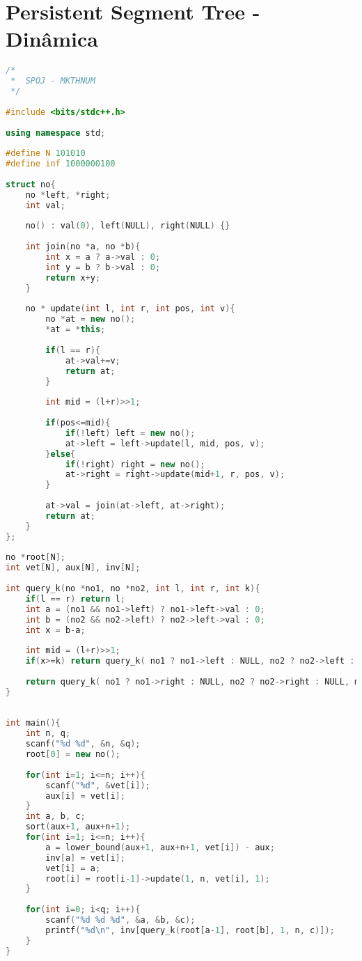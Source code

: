 \documentclass[12pt,a4paper,twoside]{report}
\begin{document}
\section{Persistent Segment Tree - Dinâmica}
\noindent\begin{lstlisting}[caption=Persistent Segment Tree - Dinâmica,language=C++]
/*
 *  SPOJ - MKTHNUM
 */
 
#include <bits/stdc++.h>
 
using namespace std;
 
#define N 101010
#define inf 1000000100
 
struct no{
    no *left, *right;
    int val;
     
    no() : val(0), left(NULL), right(NULL) {}
     
    int join(no *a, no *b){
        int x = a ? a->val : 0;
        int y = b ? b->val : 0;
        return x+y;
    }
     
    no * update(int l, int r, int pos, int v){
        no *at = new no();
        *at = *this;
         
        if(l == r){
            at->val+=v;
            return at;
        }
         
        int mid = (l+r)>>1;
         
        if(pos<=mid){
            if(!left) left = new no();
            at->left = left->update(l, mid, pos, v);
        }else{
            if(!right) right = new no();
            at->right = right->update(mid+1, r, pos, v);
        }
         
        at->val = join(at->left, at->right);
        return at;
    }
};
 
no *root[N];
int vet[N], aux[N], inv[N];
 
int query_k(no *no1, no *no2, int l, int r, int k){
    if(l == r) return l;
    int a = (no1 && no1->left) ? no1->left->val : 0;
    int b = (no2 && no2->left) ? no2->left->val : 0;
    int x = b-a;
     
    int mid = (l+r)>>1;
    if(x>=k) return query_k( no1 ? no1->left : NULL, no2 ? no2->left : NULL, l, mid, k);
   
    return query_k( no1 ? no1->right : NULL, no2 ? no2->right : NULL, mid+1, r, k-x);
}
 
 
int main(){     
    int n, q;
    scanf("%d %d", &n, &q);
    root[0] = new no();
     
    for(int i=1; i<=n; i++){
        scanf("%d", &vet[i]);
        aux[i] = vet[i];
    }
    int a, b, c;
    sort(aux+1, aux+n+1);
    for(int i=1; i<=n; i++){
        a = lower_bound(aux+1, aux+n+1, vet[i]) - aux;
        inv[a] = vet[i];
        vet[i] = a;
        root[i] = root[i-1]->update(1, n, vet[i], 1);
    }
     
    for(int i=0; i<q; i++){
        scanf("%d %d %d", &a, &b, &c);
        printf("%d\n", inv[query_k(root[a-1], root[b], 1, n, c)]);
    }
}
\end{lstlisting}
\end{document}
